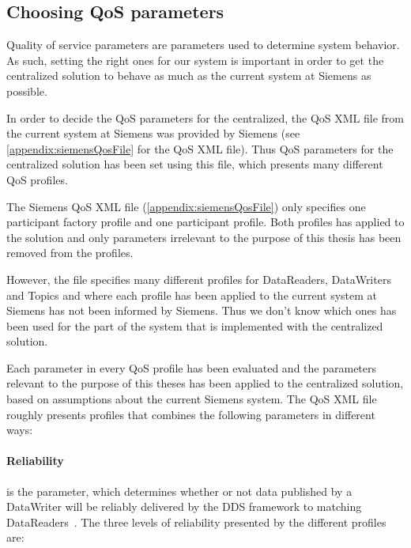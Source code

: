 \subsection{Choosing QoS parameters}

Quality of service parameters are parameters used to determine system behavior. As such, setting the right ones for our system is important in order to get the centralized solution to behave as much as the current system at Siemens as possible. 

In order to decide the QoS parameters for the centralized, the QoS XML file from the current system at Siemens was provided by Siemens (see \cref{appendix:siemensQosFile} for the QoS XML file). Thus QoS parameters for the centralized solution has been set using this file, which presents many different QoS profiles.

The Siemens QoS XML file (\cref{appendix:siemensQosFile}) only specifies one participant factory profile and one participant profile. Both profiles has applied to the solution and only parameters irrelevant to the purpose of this thesis has been removed from the profiles. 

However, the file specifies many different profiles for DataReaders, DataWriters and Topics and where each profile has been applied to the current system at Siemens has not been informed by Siemens. Thus we don't know which ones has been used for the part of the system that is implemented with the centralized solution. 

Each parameter in every QoS profile has been evaluated and the parameters relevant to the purpose of this theses has been applied to the centralized solution, based on assumptions about the current Siemens system. The QoS XML file roughly presents profiles that combines the following parameters in different ways:

\paragraph{Reliability} is the parameter, which determines whether or not data published by a DataWriter will be reliably delivered by the DDS framework to matching DataReaders~\cite{rtiConnextUsersManual}. The three levels of reliability presented by the different profiles are:

